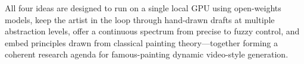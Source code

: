 All four ideas are designed to run on a single local GPU using open-weights models,
keep the artist in the loop through hand-drawn drafts at multiple abstraction levels,
offer a continuous spectrum from precise to fuzzy control, and embed principles drawn
from classical painting theory---together forming a coherent research agenda for
famous-painting dynamic video-style generation.

